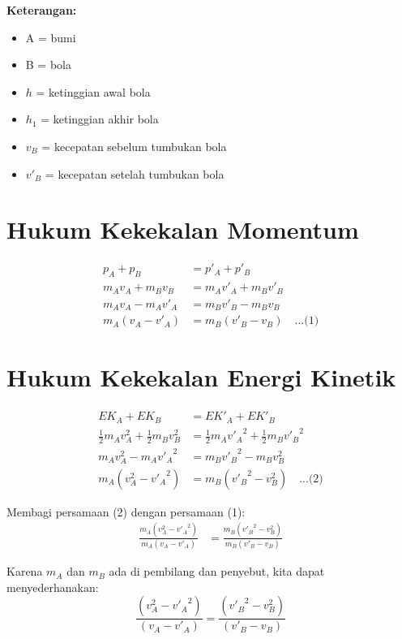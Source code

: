 \textbf{Keterangan:}
\begin{itemize}
    \item A = bumi
    \item B = bola
    \item $h$ = ketinggian awal bola
    \item $h_1$ = ketinggian akhir bola
    \item $v_B$ = kecepatan sebelum tumbukan bola
    \item $v'_B$ = kecepatan setelah tumbukan bola
\end{itemize}
\section*{Hukum Kekekalan Momentum}
\begin{align}
    p_A + p_B &= p'_A + p'_B \\
    m_A v_A + m_B v_B &= m_A v'_A + m_B v'_B \\
    m_A v_A - m_A v'_A &= m_B v'_B - m_B v_B \\
    m_A (v_A - v'_A) &= m_B (v'_B - v_B) \quad \text{...(1)}
\end{align}

\section*{Hukum Kekekalan Energi Kinetik}
\begin{align}
    EK_A + EK_B &= EK'_A + EK'_B \\
    \frac{1}{2} m_A v_A^2 + \frac{1}{2} m_B v_B^2 &= \frac{1}{2} m_A {v'_A}^2 + \frac{1}{2} m_B {v'_B}^2 \\
    m_A v_A^2 - m_A {v'_A}^2 &= m_B {v'_B}^2 - m_B v_B^2 \\
    m_A (v_A^2 - {v'_A}^2) &= m_B ({v'_B}^2 - v_B^2) \quad \text{...(2)}
\end{align}

Membagi persamaan (2) dengan persamaan (1):
\begin{align}
    \frac{m_A (v_A^2 - {v'_A}^2)}{m_A (v_A - v'_A)} &= \frac{m_B ({v'_B}^2 - v_B^2)}{m_B (v'_B - v_B)}
\end{align}

Karena \( m_A \) dan \( m_B \) ada di pembilang dan penyebut, kita dapat menyederhanakan:
\begin{equation}
    \frac{(v_A^2 - {v'_A}^2)}{(v_A - v'_A)} = \frac{({v'_B}^2 - v_B^2)}{(v'_B - v_B)}
\end{equation}

